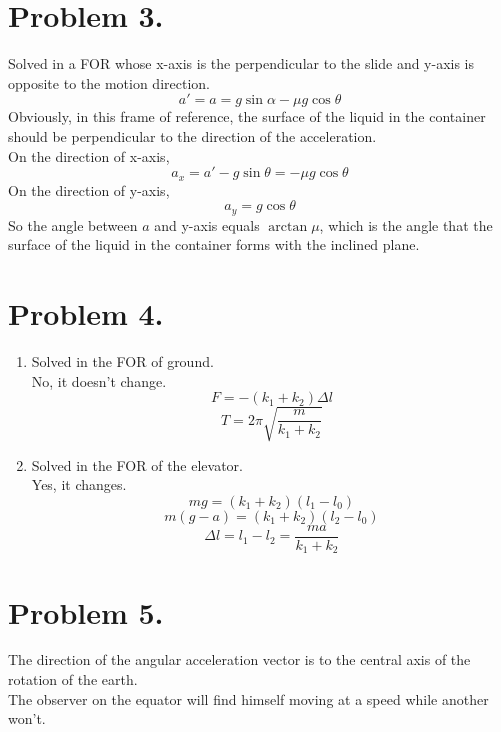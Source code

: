 \documentclass{article}
\begin{document}
\section*{Problem 3.}
	Solved in a FOR whose x-axis is the perpendicular to the slide and y-axis is opposite to the motion direction.
	$$a'=a=g\sin\alpha-\mu g\cos\theta$$
	Obviously, in this frame of reference, the surface of the liquid in the container should be perpendicular to the direction of the acceleration.\\
	On the direction of x-axis, $$a_x=a'-g\sin\theta=-\mu g\cos\theta$$
	On the direction of y-axis, $$a_y=g\cos\theta$$
	So the angle between $a$ and y-axis equals $\arctan\mu$, which is the angle that the surface of the liquid in the container forms with the inclined plane.
	
\section*{Problem 4.}
\begin{enumerate}
	\item
	Solved in the FOR of ground.\\
	No, it doesn't change.\\
	$$F=-(k_1+k_2)\Delta l$$
	$$T=2\pi\sqrt{\frac{m}{k_1+k_2}}$$
	\item
	Solved in the FOR of the elevator.\\
	Yes, it changes.
	$$mg=(k_1+k_2)(l_1-l_0)$$
	$$m(g-a)=(k_1+k_2)(l_2-l_0)$$
	$$\Delta l=l_1-l_2=\frac{ma}{k_1+k_2}$$
\end{enumerate}

\section*{Problem 5.}
The direction of the angular acceleration vector is to the central axis of the rotation of the earth.\\
The observer on the equator will find himself moving at a speed while another won't.
\end{document}
